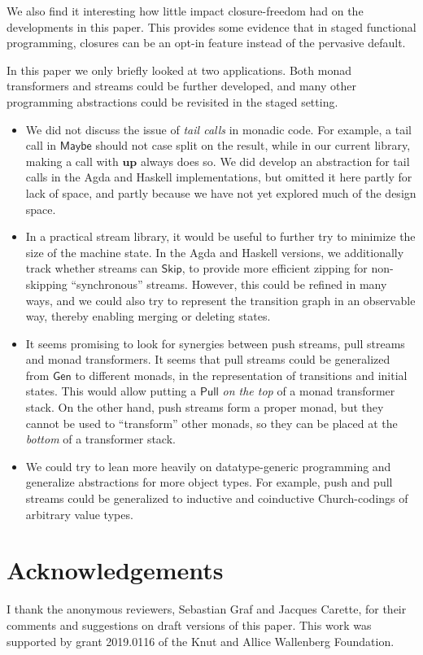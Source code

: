 \documentclass[acmsmall,screen]{acmart}
\newcommand{\msf}[1]{{\mathsf{#1}}}
\newcommand{\mbf}[1]{{\mathbf{#1}}}
\newcommand{\Maybe}{\msf{Maybe}}
\theoremstyle{remark}
\newcommand{\mup}{\mbf{up}}
\newcommand{\Gen}{\msf{Gen}}
\newcommand{\Skip}{\msf{Skip}}
\newcommand{\Pull}{\msf{Pull}}
\begin{document}
We also find it interesting how little impact closure-freedom had on the
developments in this paper. This provides some evidence that in staged
functional programming, closures can be an opt-in feature instead of the
pervasive default.

In this paper we only briefly looked at two applications. Both monad
transformers and streams could be further developed, and many other programming
abstractions could be revisited in the staged setting.
\begin{itemize}
\item
     We did not discuss the issue of \emph{tail calls} in monadic code. For
     example, a tail call in $\Maybe$ should not case split on the result, while
     in our current library, making a call with $\mup$ always does so. We did
     develop an abstraction for tail calls in the Agda and Haskell
     implementations, but omitted it here partly for lack of space, and partly
     because we have not yet explored much of the design space.

\item In a practical stream library, it would be useful to further try to
     minimize the size of the machine state. In the Agda and Haskell versions, we
     additionally track whether streams can $\Skip$, to provide more efficient
     zipping for non-skipping ``synchronous'' streams. However, this could be
     refined in many ways, and we could also try to represent the transition
     graph in an observable way, thereby enabling merging or deleting states.

\item It seems promising to look for synergies between push streams, pull streams
     and monad transformers. It seems that pull streams could be generalized from
     $\Gen$ to different monads, in the representation of transitions and initial
     states. This would allow putting a $\Pull$ \emph{on the top} of a monad
     transformer stack. On the other hand, push streams form a proper monad, but
     they cannot be used to ``transform'' other monads, so they can be placed
     at the \emph{bottom} of a transformer stack.
\item We could try to lean more heavily on datatype-generic programming and
     generalize abstractions for more object types. For example, push and pull
     streams could be generalized to inductive and coinductive Church-codings of
     arbitrary value types.
\end{itemize}

\section*{Acknowledgements}
I thank the anonymous reviewers, Sebastian Graf and Jacques Carette, for their
comments and suggestions on draft versions of this paper. This work was supported
by grant 2019.0116 of the Knut and Allice Wallenberg Foundation.
\end{document}
